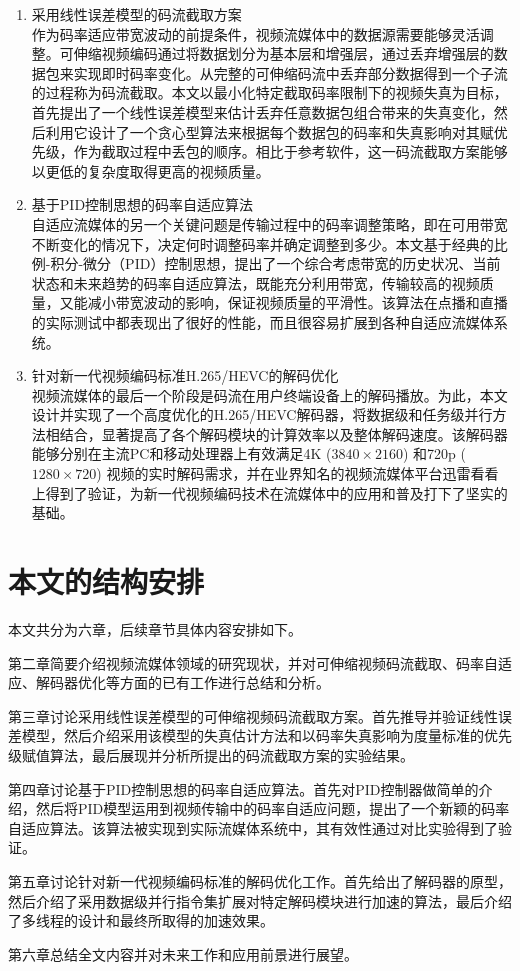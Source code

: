 \begin{enumerate}
	\item {采用线性误差模型的码流截取方案}\\
	作为码率适应带宽波动的前提条件，视频流媒体中的数据源需要能够灵活调整。可伸缩视频编码通过将数据划分为基本层和增强层，通过丢弃增强层的数据包来实现即时码率变化。从完整的可伸缩码流中丢弃部分数据得到一个子流的过程称为码流截取。本文以最小化特定截取码率限制下的视频失真为目标，首先提出了一个线性误差模型来估计丢弃任意数据包组合带来的失真变化，然后利用它设计了一个贪心型算法来根据每个数据包的码率和失真影响对其赋优先级，作为截取过程中丢包的顺序。相比于参考软件，这一码流截取方案能够以更低的复杂度取得更高的视频质量。
	\item {基于PID控制思想的码率自适应算法}\\
	自适应流媒体的另一个关键问题是传输过程中的码率调整策略，即在可用带宽不断变化的情况下，决定何时调整码率并确定调整到多少。本文基于经典的比例-积分-微分（PID）控制思想，提出了一个综合考虑带宽的历史状况、当前状态和未来趋势的码率自适应算法，既能充分利用带宽，传输较高的视频质量，又能减小带宽波动的影响，保证视频质量的平滑性。该算法在点播和直播的实际测试中都表现出了很好的性能，而且很容易扩展到各种自适应流媒体系统。
	\item {针对新一代视频编码标准H.265/HEVC的解码优化}\\
	视频流媒体的最后一个阶段是码流在用户终端设备上的解码播放。为此，本文设计并实现了一个高度优化的H.265/HEVC解码器，将数据级和任务级并行方法相结合，显著提高了各个解码模块的计算效率以及整体解码速度。该解码器能够分别在主流PC和移动处理器上有效满足4K ($3840 \times 2160$) 和720p ($1280 \times 720$) 视频的实时解码需求，并在业界知名的视频流媒体平台迅雷看看上得到了验证，为新一代视频编码技术在流媒体中的应用和普及打下了坚实的基础。 
\end{enumerate}

\section{本文的结构安排}

本文共分为六章，后续章节具体内容安排如下。

第二章简要介绍视频流媒体领域的研究现状，并对可伸缩视频码流截取、码率自适应、解码器优化等方面的已有工作进行总结和分析。

第三章讨论采用线性误差模型的可伸缩视频码流截取方案。首先推导并验证线性误差模型，然后介绍采用该模型的失真估计方法和以码率失真影响为度量标准的优先级赋值算法，最后展现并分析所提出的码流截取方案的实验结果。

第四章讨论基于PID控制思想的码率自适应算法。首先对PID控制器做简单的介绍，然后将PID模型运用到视频传输中的码率自适应问题，提出了一个新颖的码率自适应算法。该算法被实现到实际流媒体系统中，其有效性通过对比实验得到了验证。

第五章讨论针对新一代视频编码标准的解码优化工作。首先给出了解码器的原型，然后介绍了采用数据级并行指令集扩展对特定解码模块进行加速的算法，最后介绍了多线程的设计和最终所取得的加速效果。

第六章总结全文内容并对未来工作和应用前景进行展望。